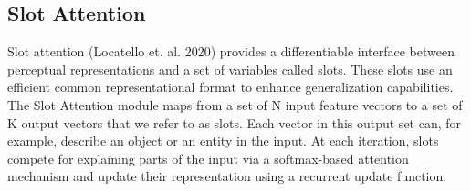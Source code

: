 \documentclass[11pt, a4paper]{article}
\begin{document}
\subsection{Slot Attention}
Slot attention (Locatello et. al. 2020) provides a differentiable interface between perceptual representations and a set of variables called slots. These slots use an efficient common representational format to enhance generalization capabilities. The Slot Attention module maps from a set of N input feature vectors to a set of K output vectors that we refer to as slots. Each vector in this output set can, for example, describe an object or an entity in the input. At each iteration, slots compete for explaining parts of the input via a softmax-based attention
mechanism and update their representation using a recurrent update function. 
\end{document}
